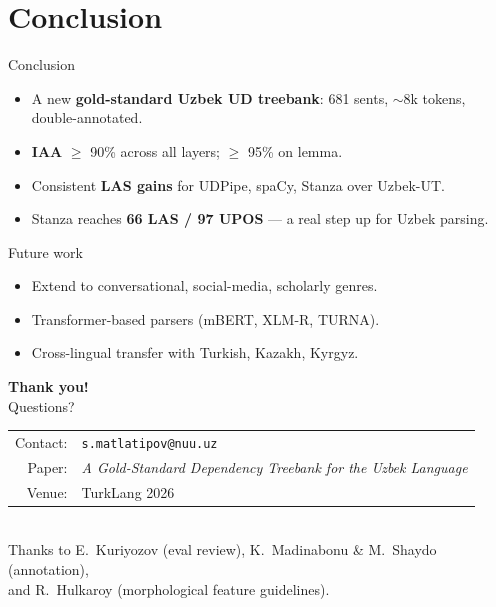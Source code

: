 \documentclass[10pt,aspectratio=169]{beamer}
\begin{document}
\section{Conclusion}
\begin{frame}{Conclusion}
   \begin{itemize}
      \item A new \textbf{gold-standard Uzbek UD treebank}: 681 sents, $\sim$8k tokens, double-annotated.
      \item \textbf{IAA} $\geq$ 90\% across all layers; $\geq$ 95\% on lemma.
      \item Consistent \textbf{LAS gains} for UDPipe, spaCy, Stanza over Uzbek-UT.
      \item Stanza reaches \textbf{66 LAS / 97 UPOS} — a real step up for Uzbek parsing.
   \end{itemize}
   \vspace{0.5em}
   \begin{block}{Future work}
      \begin{itemize}
         \item Extend to conversational, social-media, scholarly genres.
         \item Transformer-based parsers (mBERT, XLM-R, TURNA).
         \item Cross-lingual transfer with Turkish, Kazakh, Kyrgyz.
      \end{itemize}
   \end{block}
\end{frame}

\begin{frame}[plain]
   \begin{center}
      {\Large \textbf{Thank you!}}\\[0.6em]
      {\large Questions?}\\[1.2em]
      \begin{tabular}{rl}
         Contact: & \texttt{s.matlatipov@nuu.uz}\\
         Paper:   & \emph{A Gold-Standard Dependency Treebank for the Uzbek Language}\\
         Venue:   & TurkLang 2026\\
      \end{tabular}\\[1em]
      \footnotesize
      Thanks to E.~Kuriyozov (eval review), K.~Madinabonu \& M.~Shaydo (annotation),\\
      and R.~Hulkaroy (morphological feature guidelines).
   \end{center}
\end{frame}
\end{document}
